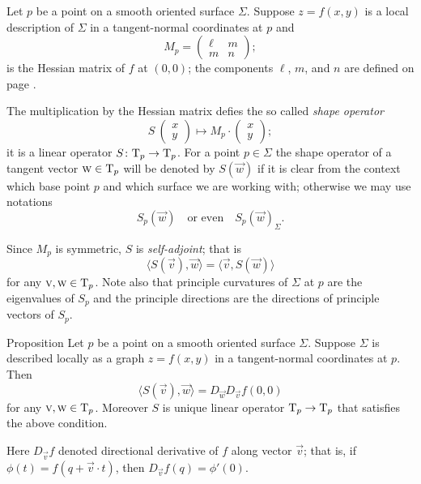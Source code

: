 Let $p$ be a point on a smooth oriented surface $\Sigma$.
Suppose $z=f(x,y)$ is a local description of $\Sigma$ in a tangent-normal coordinates at $p$
and 
\[M_p=\begin{pmatrix}
   \ell
   &m
   \\
   m
   &n
  \end{pmatrix};
\]
is the Hessian matrix of $f$ at $(0,0)$; the components $\ell$, $m$, and $n$ are defined on page \pageref{page:lmn}.

The multiplication by the Hessian matrix defies the so called \emph{shape operator}
\[S\:(\begin{smallmatrix}
x\\y
\end{smallmatrix})
\mapsto
M_p\cdot(\begin{smallmatrix}
x\\y
\end{smallmatrix});\]
it is a linear operator $S\colon\mathrm{T}_p\to \mathrm{T}_p$.
For a point $p\in \Sigma$ the shape operator of a tangent vector $\textsc w\in \mathrm{T}_p$ will be denoted by $S(\vec w)$ if it is clear from the context which base point $p$ and which surface we are working with;
otherwise we may use notations 
\[S_p(\vec w)\quad\text{or even}\quad S_p(\vec w)_\Sigma.\]

Since $M_p$ is symmetric, $S$ is \emph{self-adjoint}; that is
\[\langle S(\vec v),\vec w\rangle=\langle \vec v,S(\vec w)\rangle\]
for any $\textsc v,\textsc w\in\mathrm{T}_p$.
Note also that principle curvatures of $\Sigma$ at $p$ are the eigenvalues of $S_p$ and the principle directions are the directions of principle vectors of $S_p$.

\begin{thm}{Proposition}\label{prop:shape=D2}
Let $p$ be a point on a smooth oriented surface $\Sigma$.
Suppose $\Sigma$ is described locally as a graph $z=f(x,y)$ in a tangent-normal coordinates at $p$.
Then
\[\langle S(\vec v),\vec w\rangle=D_{\vec w}D_{\vec v}f(0,0)\]
for any $\textsc v,\textsc w\in\mathrm{T}_p$.
Moreover $S$ is unique linear operator $\mathrm{T}_p\to\mathrm{T}_p$ that satisfies the above condition.
\end{thm}

Here $D_{\vec v}f$ denoted directional derivative of $f$ along vector $\vec v$;
that is, if $\phi(t)=f(q+\vec v\cdot t)$, then $D_{\vec v}f(q)=\phi'(0)$.

